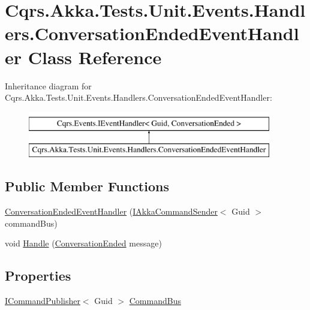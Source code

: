 \hypertarget{classCqrs_1_1Akka_1_1Tests_1_1Unit_1_1Events_1_1Handlers_1_1ConversationEndedEventHandler}{}\section{Cqrs.\+Akka.\+Tests.\+Unit.\+Events.\+Handlers.\+Conversation\+Ended\+Event\+Handler Class Reference}
\label{classCqrs_1_1Akka_1_1Tests_1_1Unit_1_1Events_1_1Handlers_1_1ConversationEndedEventHandler}
Inheritance diagram for Cqrs.\+Akka.\+Tests.\+Unit.\+Events.\+Handlers.\+Conversation\+Ended\+Event\+Handler\+:\begin{figure}[H]
\begin{center}
\leavevmode
\includegraphics[height=2.000000cm]{classCqrs_1_1Akka_1_1Tests_1_1Unit_1_1Events_1_1Handlers_1_1ConversationEndedEventHandler}
\end{center}
\end{figure}
\subsection*{Public Member Functions}
\begin{DoxyCompactItemize}
\item 
\hyperlink{classCqrs_1_1Akka_1_1Tests_1_1Unit_1_1Events_1_1Handlers_1_1ConversationEndedEventHandler_adf9143b7444b05fab2d43750fa7c89b8}{Conversation\+Ended\+Event\+Handler} (\hyperlink{interfaceCqrs_1_1Akka_1_1Commands_1_1IAkkaCommandSender}{I\+Akka\+Command\+Sender}$<$ Guid $>$ command\+Bus)
\item 
void \hyperlink{classCqrs_1_1Akka_1_1Tests_1_1Unit_1_1Events_1_1Handlers_1_1ConversationEndedEventHandler_a1e363c715cefdb600705d7b3f5e3bca6}{Handle} (\hyperlink{classCqrs_1_1Akka_1_1Tests_1_1Unit_1_1Events_1_1ConversationEnded}{Conversation\+Ended} message)
\end{DoxyCompactItemize}
\subsection*{Properties}
\begin{DoxyCompactItemize}
\item 
\hyperlink{interfaceCqrs_1_1Commands_1_1ICommandPublisher}{I\+Command\+Publisher}$<$ Guid $>$ \hyperlink{classCqrs_1_1Akka_1_1Tests_1_1Unit_1_1Events_1_1Handlers_1_1ConversationEndedEventHandler_a2ad947f0ed860a416ba8a0795caa06d1}{Command\+Bus}
\end{DoxyCompactItemize}


